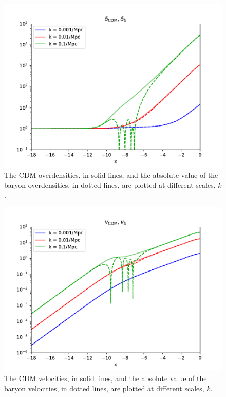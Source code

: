 \documentclass{aa}
\begin{document}
\begin{figure}[h!]
   \includegraphics[scale=0.6]{../figures/milestone3/test_delta_cdm_delta_b.pdf}
   \caption{The CDM overdensities, in solid lines, and the absolute value of the baryon overdensities,
    in dotted lines, are plotted at different scales, $k$.}\label{fig:test1}
\end{figure}

\begin{figure}[h!]
   \includegraphics[scale=0.6]{../figures/milestone3/test_v_cdm_v_b.pdf}
   \caption{The CDM velocities, in solid lines, and the absolute value of the baryon velocities,
    in dotted lines, are plotted at different scales, $k$.}\label{fig:test2}
\end{figure}
\end{document}
